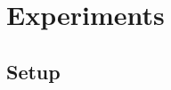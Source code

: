 \documentclass{article}
\begin{document}



\section{Experiments}
\label{sec:exp}


%
%
%
%
\subsection{Setup}
\label{sec:exp:setup}
\end{document}
